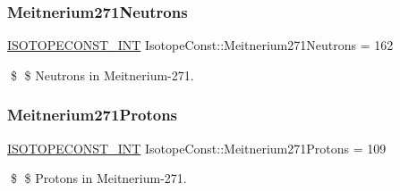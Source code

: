 \subsubsection{\texorpdfstring{Meitnerium271\+Neutrons}{Meitnerium271Neutrons}}
{\footnotesize\ttfamily \mbox{\hyperlink{group___isotope_const-_macros_ga5f18360b3e99483a35c32d789e62621c}{I\+S\+O\+T\+O\+P\+E\+C\+O\+N\+S\+T\+\_\+\+I\+NT}} Isotope\+Const\+::\+Meitnerium271\+Neutrons = 162}

\$ \$ Neutrons in Meitnerium-\/271. \mbox{\label{group___isotope_const-_meitnerium-_mt271_ga40a63f3d943d7868852514bc4ef82542}} 
\subsubsection{\texorpdfstring{Meitnerium271\+Protons}{Meitnerium271Protons}}
{\footnotesize\ttfamily \mbox{\hyperlink{group___isotope_const-_macros_ga5f18360b3e99483a35c32d789e62621c}{I\+S\+O\+T\+O\+P\+E\+C\+O\+N\+S\+T\+\_\+\+I\+NT}} Isotope\+Const\+::\+Meitnerium271\+Protons = 109}

\$ \$ Protons in Meitnerium-\/271. 